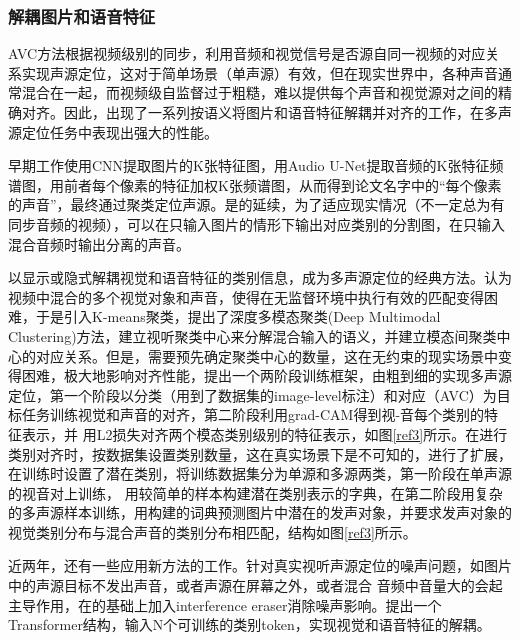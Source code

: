 \documentclass[12pt]{article}
\begin{document}
\subsubsection{解耦图片和语音特征}
AVC方法根据视频级别的同步，利用音频和视觉信号是否源自同一视频的对应关系实现声源定位，这对于简单场景（单声源）有效，但在现实世界中，各种声音通常混合在一起，而视频级自监督过于粗糙，难以提供每个声音和视觉源对之间的精确对齐。因此，出现了一系列按语义将图片和语音特征解耦并对齐的工作，在多声源定位任务中表现出强大的性能。

早期工作\cite{4}使用CNN提取图片的K张特征图，用Audio U-Net提取音频的K张特征频谱图，用前者每个像素的特征加权K张频谱图，从而得到论文名字中的“每个像素的声音”，最终通过聚类定位声源。\cite{7}是\cite{4}的延续，为了适应现实情况（不一定总为有同步音频的视频），可以在只输入图片的情形下输出对应类别的分割图，在只输入混合音频时输出分离的声音。

以显示或隐式解耦视觉和语音特征的类别信息，成为多声源定位的经典方法。\cite{9}认为视频中混合的多个视觉对象和声音，使得在无监督环境中执行有效的匹配变得困难，于是引入K-means聚类，提出了深度多模态聚类(Deep Multimodal Clustering)方法，建立视听聚类中心来分解混合输入的语义，并建立模态间聚类中心的对应关系。但是，\cite{9}需要预先确定聚类中心的数量，这在无约束的现实场景中变得困难，极大地影响对齐性能，\cite{11}提出一个两阶段训练框架，由粗到细的实现多声源定位，第一个阶段以分类（用到了数据集的image-level标注）和对应（AVC）为目标任务训练视觉和声音的对齐，第二阶段利用grad-CAM得到视-音每个类别的特征表示，并
用L2损失对齐两个模态类别级别的特征表示，如图\ref{ref3}所示。\cite{11}在进行类别对齐时，按数据集设置类别数量，这在真实场景下是不可知的，\cite{12}进行了扩展，在训练时设置了潜在类别，将训练数据集分为单源和多源两类，第一阶段在单声源的视音对上训练，
用较简单的样本构建潜在类别表示的字典，在第二阶段用复杂的多声源样本训练，用构建的词典预测图片中潜在的发声对象，并要求发声对象的视觉类别分布与混合声音的类别分布相匹配，结构如图\ref{ref3}所示。

近两年，还有一些应用新方法的工作。\cite{25}针对真实视听声源定位的噪声问题，如图片中的声源目标不发出声音，或者声源在屏幕之外，或者混合
音频中音量大的会起主导作用，在\cite{12}的基础上加入interference eraser消除噪声影响。\cite{31}提出一个Transformer结构，输入N个可训练的类别token，实现视觉和语音特征的解耦。
\end{document}
